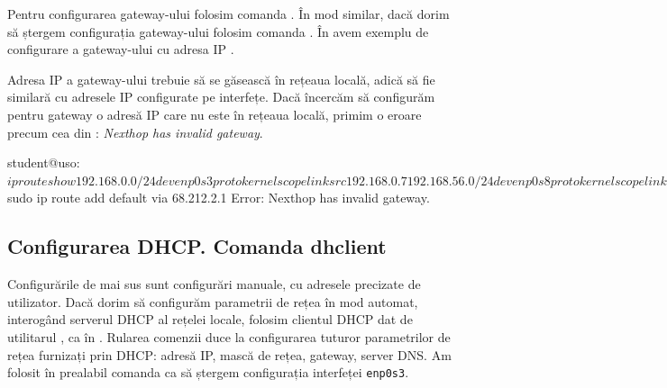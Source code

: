 Pentru configurarea gateway-ului folosim comanda .
În mod similar, dacă dorim să ștergem configurația gateway-ului folosim comanda .
În  avem exemplu de configurare a gateway-ului cu adresa IP .


Adresa IP a gateway-ului trebuie să se găsească în rețeaua locală, adică să fie similară cu adresele IP configurate pe interfețe.
Dacă încercăm să configurăm pentru gateway o adresă IP care nu este în rețeaua locală, primim o eroare precum cea din : \textit{Nexthop has invalid gateway}.

\begin{screen}[caption={Configurare gateway-ului cu adresă IP nevalidă},label={lst:net:add-gw-err}]
student@uso:~$ ip route show
192.168.0.0/24 dev enp0s3 proto kernel scope link src 192.168.0.7 
192.168.56.0/24 dev enp0s8 proto kernel scope link src 192.168.56.101 

student@uso:~$ sudo ip route add default via 68.212.2.1
Error: Nexthop has invalid gateway.
\end{screen}

\subsection{Configurarea DHCP. Comanda dhclient}
\label{sec:net:dhclient}

Configurările de mai sus sunt configurări manuale, cu adresele precizate de utilizator.
Dacă dorim să configurăm parametrii de rețea în mod automat, interogând serverul DHCP al rețelei locale, folosim clientul DHCP dat de utilitarul , ca în .
Rularea comenzii  duce la configurarea tuturor parametrilor de rețea furnizați prin DHCP: adresă IP, mască de rețea, gateway, server DNS.
Am folosit în prealabil comanda  ca să ștergem configurația interfeței \texttt{enp0s3}.

